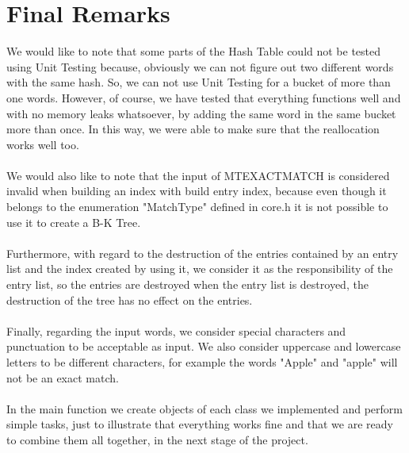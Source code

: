 \documentclass{article}
\begin{document}
\section{Final Remarks}
We would like to note that some parts of the Hash Table could not be tested using Unit Testing because, obviously we can not figure out two different words with the same hash. So, we can not use Unit Testing for a bucket of more than one words. However, of course, we have tested that everything functions well and with no memory leaks whatsoever, by adding the same word in the same bucket more than once. In this way, we were able to make sure that the reallocation works well too. \\ \\
We would also like to note that the input of MT\textunderscore EXACT\textunderscore MATCH is considered invalid when building an index with build entry index, because even though it belongs to the enumeration "MatchType" defined in core.h it is not possible to use it to create a B-K Tree.\\ \\
Furthermore, with regard to the destruction of the entries contained by an entry list and the index created by using it, we consider it as the responsibility of the entry list, so the entries are destroyed when the entry list is destroyed, the destruction of the tree has no effect on the entries.\\ \\
Finally, regarding the input words, we consider special characters and punctuation to be acceptable as input. We also consider uppercase and lowercase letters to be different characters, for example the words "Apple" and "apple" will not be an exact match. \\ \\
In the main function we create objects of each class we implemented and perform simple tasks, just to illustrate that everything works fine and that we are ready to combine them all together, in the next stage of the project. 
\end{document}
